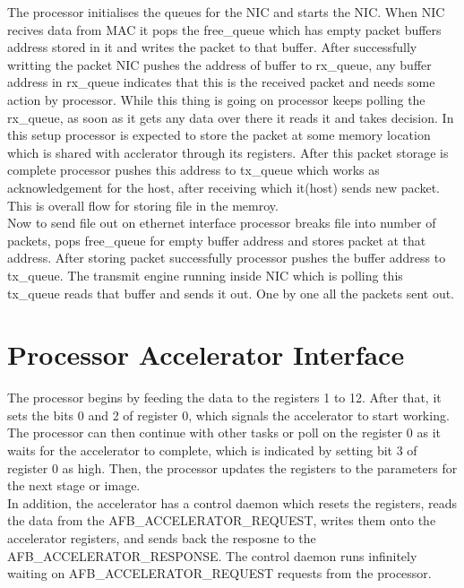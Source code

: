 \documentclass[a4paper,12pt, final]{report}
\begin{document}
The processor initialises the queues for the NIC and starts the NIC. When NIC recives data from MAC it pops the free\_queue which has empty packet buffers address stored in it and writes the packet to that buffer. After successfully writting the packet NIC pushes the address of buffer to rx\_queue, any buffer address in rx\_queue indicates that this is the received packet and needs some action by processor. While this thing is going on processor keeps polling the rx\_queue, as soon as it gets any data over there it reads it and takes decision. In this setup processor is expected to store the packet at some memory location which is shared with acclerator through its registers. After this packet storage is complete processor pushes this address to tx\_queue which works as acknowledgement for the host, after receiving which it(host) sends new packet. This is overall flow for storing file in the memroy.
\\

Now to send file out on ethernet interface processor breaks file into number of packets, pops free\_queue for empty buffer address and stores packet at that address. After storing packet successfully processor pushes the buffer address to tx\_queue. The transmit engine running inside NIC which is polling this tx\_queue reads that buffer and sends it out. One by one all the packets sent out.


\section{Processor Accelerator Interface}

The processor begins by feeding the data to the registers 1 to 12. After that, it sets the bits 0 and 2 of register 0, which signals the accelerator to start working. The processor can then continue with other tasks or poll on the register 0 as it waits for the accelerator to complete, which is indicated by setting bit 3 of register 0 as high. Then, the processor updates the registers to the parameters for the next stage or image.
\\

In addition, the accelerator has a control daemon which resets the registers, reads the data from the AFB\_ACCELERATOR\_REQUEST, writes them onto the accelerator registers, and sends back the resposne to the AFB\_ACCELERATOR\_RESPONSE. The control daemon runs infinitely waiting on AFB\_ACCELERATOR\_REQUEST requests from the processor.
\\
\end{document}

